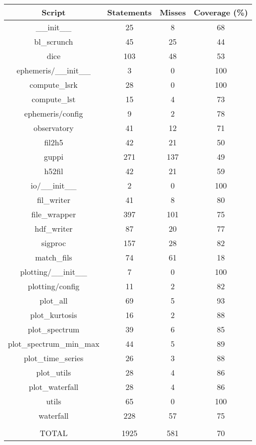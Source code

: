 \documentclass[12pt]{article}
\begin{document}
\begin{center}
 \begin{tabular}{||c c c c||} 
 \hline
 Script & Statements & Misses & Coverage (\%)\\ [0.5ex] 
 \hline
\_\_init\_\_ & 25 & 8 & 68 \\
\hline
bl\_scrunch & 45 & 25 & 44 \\
\hline
dice & 103 & 48 & 53 \\
\hline
ephemeris/\_\_init\_\_ & 3 & 0 & 100 \\
\hline
compute\_lsrk & 28 & 0 & 100 \\
\hline
compute\_lst & 15 & 4 & 73 \\
\hline
ephemeris/config & 9 & 2 & 78 \\
\hline
observatory & 41 & 12 & 71 \\
\hline
fil2h5 & 42 & 21 & 50 \\
\hline
guppi & 271 & 137 & 49 \\
\hline
h52fil & 42 & 21 & 59 \\
\hline
io/\_\_init\_\_ & 2 & 0 & 100 \\
\hline
fil\_writer & 41 & 8 & 80 \\
\hline
file\_wrapper & 397 & 101 & 75 \\
\hline
hdf\_writer & 87 & 20 & 77 \\
\hline
sigproc & 157 & 28 & 82 \\
\hline
match\_fils & 74 & 61 & 18 \\
\hline
plotting/\_\_init\_\_ & 7 & 0 & 100 \\
\hline
plotting/config & 11 & 2 & 82 \\
\hline
plot\_all & 69 & 5 & 93 \\
\hline
plot\_kurtosis & 16 & 2 & 88 \\
\hline
plot\_spectrum & 39 & 6 & 85 \\
\hline
plot\_spectrum\_min\_max & 44 & 5 & 89 \\
\hline
plot\_time\_series & 26 & 3 & 88 \\
\hline
plot\_utils & 28 & 4 & 86 \\
\hline
plot\_waterfall & 28 & 4 & 86 \\
\hline
utils & 65 & 0 & 100 \\
\hline
waterfall & 228 & 57 & 75 \\
\hline
&&&
\\
\hline
TOTAL & 1925 & 581 & 70 \\ [1ex] 
\hline
\end{tabular}
\end{center}
\end{document}
